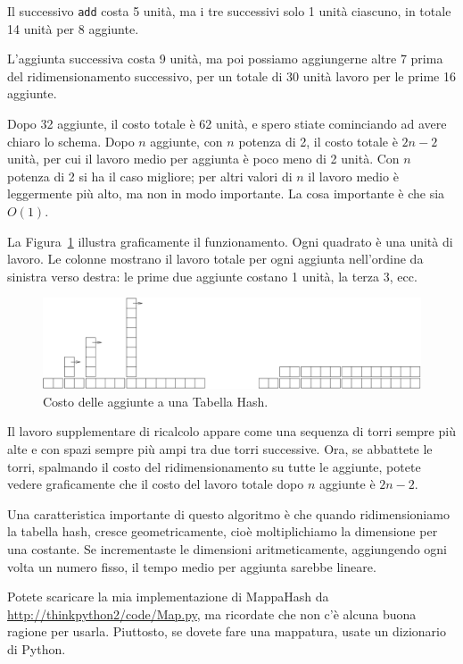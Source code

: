 \documentclass[10pt]{book}
\begin{document}
Il successivo {\tt add} costa 5 unità, ma i tre successivi solo 1 unità ciascuno, in totale 14 unità per 8 aggiunte.

L'aggiunta successiva costa 9 unità, ma poi possiamo aggiungerne altre 7 prima del ridimensionamento successivo, per un totale di 30 unità lavoro per le prime 16 aggiunte.

Dopo 32 aggiunte, il costo totale è 62 unità, e spero stiate cominciando ad avere chiaro lo schema. Dopo $n$ aggiunte, con $n$ potenza di 2, il costo totale è $2n-2$ unità, per cui il lavoro medio per aggiunta è poco meno di 2 unità. Con $n$ potenza di 2 si ha il caso migliore; per altri valori di $n$ il lavoro medio è leggermente più alto, ma non in modo importante. La cosa importante è che sia
$O(1)$.

La Figura~\ref{fig.hash} illustra graficamente il funzionamento. Ogni quadrato è una unità di lavoro. Le colonne mostrano il lavoro totale per ogni aggiunta nell'ordine da sinistra verso destra: le prime due aggiunte costano 1 unità, la terza 3, ecc.

\begin{figure}
\centerline{\includegraphics[scale=0.6]{figs/towers.pdf}}
\caption{Costo delle aggiunte a una Tabella Hash.\label{fig.hash}}
\end{figure}

Il lavoro supplementare di ricalcolo appare come una sequenza di torri sempre più alte e con spazi sempre più ampi tra due torri successive. Ora, se abbattete le torri, spalmando il costo del ridimensionamento su tutte le aggiunte, potete vedere graficamente che il costo del lavoro totale dopo $n$ aggiunte è $2n - 2$.

Una caratteristica importante di questo algoritmo è che quando ridimensioniamo la tabella hash, cresce geometricamente, cioè moltiplichiamo la dimensione per una costante. Se incrementaste le dimensioni aritmeticamente, aggiungendo ogni volta un numero fisso, il tempo medio per aggiunta sarebbe lineare.

Potete scaricare la mia implementazione di MappaHash da
\url{http://thinkpython2/code/Map.py}, ma ricordate che non c'è alcuna buona ragione per usarla. Piuttosto, se dovete fare una mappatura, usate un dizionario di Python.
\end{document}
